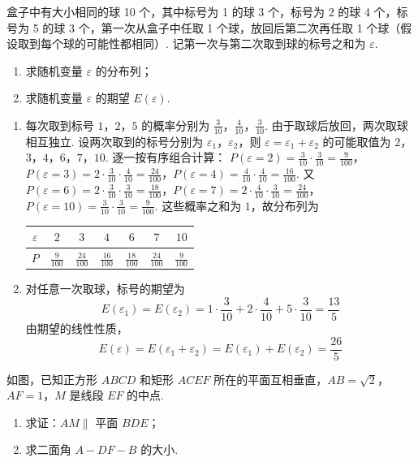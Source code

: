 \begin{problem}
盒子中有大小相同的球 10 个，其中标号为 1 的球 3 个，标号为 2 的球 4 个，标号为 5 的球 3 个，第一次从盒子中任取 1 个球，放回后第二次再任取 1 个球（假设取到每个球的可能性都相同）. 记第一次与第二次取到球的标号之和为 \(\varepsilon\).
\begin{enumerate}
\item 求随机变量 \(\varepsilon\) 的分布列；
\item 求随机变量 \(\varepsilon\) 的期望 \(E(\varepsilon)\).
\end{enumerate}
\end{problem}

\begin{solution}
\begin{enumerate}
\item 每次取到标号 \(1\)，\(2\)，\(5\) 的概率分别为
\(\frac3{10}\)，\(\frac4{10}\)，\(\frac3{10}\). 由于取球后放回，两次取球相互独立. 设两次取到的标号分别为 \(\varepsilon_1\)，\(\varepsilon_2\)，则
\(\varepsilon=\varepsilon_1+\varepsilon_2\) 的可能取值为 \(2\)，\(3\)，\(4\)，\(6\)，\(7\)，\(10\). 逐一按有序组合计算：
\(P(\varepsilon=2)=\frac3{10}\cdot\frac3{10}=\frac9{100}\)，\(P(\varepsilon=3)=2\cdot\frac3{10}\cdot\frac4{10}=\frac{24}{100}\)，\(P(\varepsilon=4)=\frac4{10}\cdot\frac4{10}=\frac{16}{100}\). 又 \(P(\varepsilon=6)=2\cdot\frac3{10}\cdot\frac3{10}=\frac{18}{100}\)，\(P(\varepsilon=7)=2\cdot\frac4{10}\cdot\frac3{10}=\frac{24}{100}\)，\(P(\varepsilon=10)=\frac3{10}\cdot\frac3{10}=\frac9{100}\).
这些概率之和为 \(1\)，故分布列为
\begin{center}
\begin{tabular}{c|cccccc}
\hline
\(\varepsilon\) & \(2\) & \(3\) & \(4\) & \(6\) & \(7\) & \(10\) \\
\hline
\(P\) & \(\frac9{100}\) & \(\frac{24}{100}\) & \(\frac{16}{100}\) & \(\frac{18}{100}\) & \(\frac{24}{100}\) & \(\frac9{100}\) \\
\hline
\end{tabular}
\end{center}
\item 对任意一次取球，标号的期望为
\[
E(\varepsilon_1)=E(\varepsilon_2)
=1\cdot\frac3{10}+2\cdot\frac4{10}+5\cdot\frac3{10}
=\frac{13}{5}
\]
由期望的线性性质，
\[
E(\varepsilon)=E(\varepsilon_1+\varepsilon_2)
=E(\varepsilon_1)+E(\varepsilon_2)
=\frac{26}{5}
\]
\end{enumerate}
\end{solution}

\begin{problem}
如图，已知正方形 \(ABCD\) 和矩形 \(ACEF\) 所在的平面互相垂直，\(AB=\sqrt{2}\)，\(AF=1\)，\(M\) 是线段 \(EF\) 的中点.
\begin{enumerate}
\item 求证：\(AM \parallel\) 平面 \(BDE\)；
\item 求二面角 \(A-DF-B\) 的大小.
\end{enumerate}

\end{problem}

